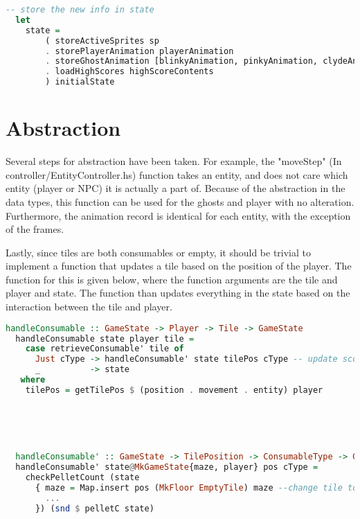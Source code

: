 \documentclass[11pt]{Article}
\begin{document}
\begin{lstlisting}[language=Haskell]
  -- store the new info in state
  let
    state =
        ( storeActiveSprites sp
        . storePlayerAnimation playerAnimation
        . storeGhostAnimation [blinkyAnimation, pinkyAnimation, clydeAnimation, inkyAnimation]
        . loadHighScores highScoreContents
        ) initialState
\end{lstlisting}

\section{Abstraction} \label{ch:abstraction}
Several steps for abstraction have been taken. For example, the "moveStep" (In controller/EntityController.hs) function takes an entity, and does not care which entity (player or NPC) it is actually a part of. Because of the abstraction in the data types, this function can be used for the ghosts and player with no alteration. Furthermore, the animation record is identical for each entity, with the exception of the frames. 

Lastly, since tiles are both consumables or empty, it should be trivial to implement a function that updates a tile based on the position of the player. The function for this is given below, where the function arguments are the tile and player and state. The function than updates everything in the state based on the interaction between the tile and player.

\begin{lstlisting}[language=Haskell]
  handleConsumable :: GameState -> Player -> Tile -> GameState
  handleConsumable state player tile =
    case retrieveConsumable' tile of
      Just cType -> handleConsumable' state tilePos cType -- update score etc.
      _          -> state
   where
    tilePos = getTilePos $ (position . movement . entity) player




    
  handleConsumable' :: GameState -> TilePosition -> ConsumableType -> GameState
  handleConsumable' state@MkGameState{maze, player} pos cType =
    checkPelletCount (state
      { maze = Map.insert pos (MkFloor EmptyTile) maze --change tile to emptyTile
        ...
      }) (snd $ pelletC state)
  
\end{lstlisting}
\end{document}
